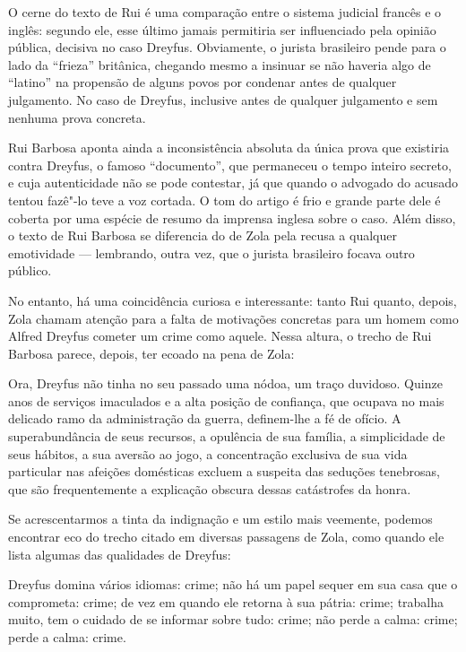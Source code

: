  O cerne do texto de Rui é uma comparação entre o sistema judicial
francês e o inglês: segundo ele, esse último jamais permitiria ser
influenciado pela opinião pública, decisiva no caso Dreyfus.
Obviamente, o jurista brasileiro pende para o lado da “frieza”
britânica, chegando mesmo a insinuar se não haveria algo de “latino” na
propensão de alguns povos por condenar antes de qualquer julgamento. No
caso de Dreyfus, inclusive antes de qualquer julgamento e sem nenhuma
prova concreta.

 Rui Barbosa aponta ainda a inconsistência absoluta da única prova
que existiria contra Dreyfus, o famoso “documento”, que permaneceu o
tempo inteiro secreto, e cuja autenticidade não se pode contestar, já
que quando o advogado do acusado tentou fazê"-lo teve a voz cortada.
O tom do artigo é frio e grande parte dele é coberta por uma espécie de
resumo da imprensa inglesa sobre o caso. Além disso, o texto de Rui Barbosa se
diferencia do de Zola pela recusa a qualquer emotividade --- lembrando,
outra vez, que o jurista brasileiro focava outro público.

 No entanto, há uma coincidência curiosa e interessante: tanto Rui
quanto, depois, Zola chamam atenção para a falta de motivações
concretas para um homem como Alfred Dreyfus cometer um crime como
aquele. Nessa altura, o trecho de Rui Barbosa parece, depois, ter ecoado na
pena de Zola: 

\begin{hedraquote}
Ora, Dreyfus não tinha no seu passado uma nódoa, um
traço duvidoso. Quinze anos de serviços imaculados e a alta posição de
confiança, que ocupava no mais delicado ramo da administração da
guerra, definem-lhe a fé de ofício. A superabundância de seus
recursos, a opulência de sua família, a simplicidade de seus hábitos,
a sua aversão ao jogo, a concentração exclusiva de sua vida particular
nas afeições domésticas excluem a suspeita das seduções tenebrosas, que
são frequentemente a explicação obscura dessas catástrofes da honra.
\end{hedraquote}

Se acrescentarmos a tinta da indignação e um estilo mais veemente,
podemos encontrar eco do trecho citado em diversas passagens de Zola,
como quando ele lista algumas das qualidades de Dreyfus: 

\begin{hedraquote}
Dreyfus domina vários idiomas: crime; não há um papel sequer em
sua casa que o comprometa: crime; de vez em quando ele retorna à sua
pátria: crime; trabalha muito, tem o cuidado de se informar sobre tudo:
crime; não perde a calma: crime; perde a calma: crime.
\end{hedraquote}


